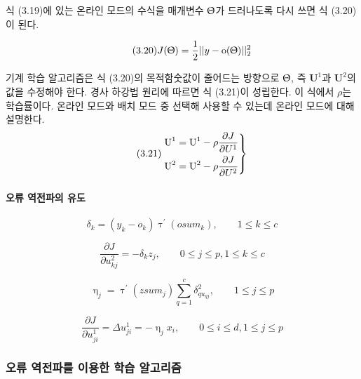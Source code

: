 \documentclass [12pt] {oblivoir}
\let\oldsubsubsection=\subsubsection
\renewcommand{\subsubsection}
{
  \filbreak
  \oldsubsubsection
}
\begin{document}
식 (3.19)에 있는 온라인 모드의 수식을 매개변수 $\Uptheta$가 드러나도록 다시 쓰면 식 (3.20)이 된다.

\begin{equation} \tag{3.20}
  J(\Uptheta) = \frac{1}{2}||y - \mathbf{\text{o}}(\Uptheta)||_{2}^{2}
\end{equation}

\vspace{3mm}
기계 학습 알고리즘은 식 (3.20)의 목적함숫값이 줄어드는 방향으로 $\Uptheta$, 즉 $\mathbf{\text{U}}^{1}$과 $\mathbf{\text{U}}^{2}$의 값을 수정해야 한다.
경사 하강법 원리에 따르면 식 (3.21)이 성립한다. 이 식에서 $\rho$는 학습률이다. 온라인 모드와 배치 모드 중 선택해 사용할 수 있는데 온라인 모드에 대해 설명한다.
\begin{equation} \tag{3.21}
  \begin{rcases}
    \mathbf{\text{U}}^{1} = \mathbf{\text{U}}^{1} - \displaystyle\rho\frac{\partial J}{\partial U^{1}} \\
    \mathbf{\text{U}}^{2} = \mathbf{\text{U}}^{2} - \displaystyle\rho\frac{\partial J}{\partial U^{2}}
  \end{rcases}
\end{equation}

\paragraph*{오류 역전파의 유도}\mbox{}

\begin{equation} \tag{3.22}
  \delta_{k} = (y_{k} - o_{k})\uptau^{'}(osum_{k}), \qquad 1 \le k \le c
\end{equation}

\begin{equation} \tag{3.23}
  \frac{\partial J}{\partial u_{kj}^{2}} = -\delta_{k}z_{j}, \qquad 0 \le j \le p, 1 \le k \le c
\end{equation}

\begin{equation} \tag{3.24}
  \upeta_{j} = \uptau^{'}(zsum_{j})\sum_{q=1}^{c}\delta_{qu_{qj}}^{2}, \qquad 1 \le j \le p
\end{equation}

\begin{equation} \tag{3.25}
  \frac{\partial J}{\partial u_{ji}^{1}} = \Delta u_{ji}^{1} = -\upeta_{j}x_{i}, \qquad 0 \le i \le d, 1 \le j \le p
\end{equation}

\subsubsection{오류 역전파를 이용한 학습 알고리즘}
\end{document}
